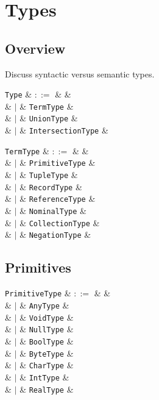 \chapter{Types}
\section{Overview}
Discuss syntactic versus semantic types.

\begin{syntax}
  \verb+Type+ & $::=$ & &\\
  & $|$ & \verb+TermType+ &\\
  & $|$ & \verb+UnionType+ &\\
  & $|$ & \verb+IntersectionType+ &\\
\end{syntax}

\begin{syntax}
  \verb+TermType+ & $::=$ & &\\
  & $|$ & \verb+PrimitiveType+ &\\
  & $|$ & \verb+TupleType+ &\\
  & $|$ & \verb+RecordType+ &\\
  & $|$ & \verb+ReferenceType+ &\\
  & $|$ & \verb+NominalType+ &\\
  & $|$ & \verb+CollectionType+ &\\
  & $|$ & \verb+NegationType+ &\\
\end{syntax}


\section{Primitives}

\begin{syntax}
  \verb+PrimitiveType+ & $::=$ & &\\
  & $|$ & \verb+AnyType+ &\\
  & $|$ & \verb+VoidType+ &\\
  & $|$ & \verb+NullType+ &\\
  & $|$ & \verb+BoolType+ &\\
  & $|$ & \verb+ByteType+ &\\
  & $|$ & \verb+CharType+ &\\
  & $|$ & \verb+IntType+ &\\
  & $|$ & \verb+RealType+ &\\
\end{syntax}


